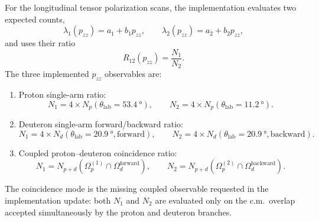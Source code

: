 \documentclass[11pt,a4paper]{article}
\begin{document}
For the longitudinal tensor polarization scans, the implementation evaluates two expected counts,
\begin{equation}
\label{eq:pzz_pair_counts}
    \lambda_1(p_{zz}) = a_1 + b_1 p_{zz},
    \qquad
    \lambda_2(p_{zz}) = a_2 + b_2 p_{zz},
\end{equation}
and uses their ratio
\begin{equation}
\label{eq:pzz_pair_ratio}
    R_{12}(p_{zz}) = \frac{N_1}{N_2}.
\end{equation}
The three implemented $p_{zz}$ observables are:
\begin{enumerate}
    \item Proton single-arm ratio:
    \begin{equation}
        N_1 = 4\times N_p(\theta_{\mathrm{lab}}=\SI{53.4}{\degree}),
        \qquad
        N_2 = 4\times N_p(\theta_{\mathrm{lab}}=\SI{11.2}{\degree}).
    \end{equation}
    \item Deuteron single-arm forward/backward ratio:
    \begin{equation}
        N_1 = 4\times N_d(\theta_{\mathrm{lab}}=\SI{20.9}{\degree},\mathrm{forward}),
        \qquad
        N_2 = 4\times N_d(\theta_{\mathrm{lab}}=\SI{20.9}{\degree},\mathrm{backward}).
    \end{equation}
    \item Coupled proton--deuteron coincidence ratio:
    \begin{equation}
        N_1 = N_{p+d}\!\left(\Omega_p^{(1)} \cap \Omega_d^{\mathrm{forward}}\right),
        \qquad
        N_2 = N_{p+d}\!\left(\Omega_p^{(2)} \cap \Omega_d^{\mathrm{backward}}\right).
    \end{equation}
\end{enumerate}
The coincidence mode is the missing coupled observable requested in the implementation update: both $N_1$ and $N_2$ are evaluated only on the c.m.\ overlap accepted simultaneously by the proton and deuteron branches.
\end{document}
